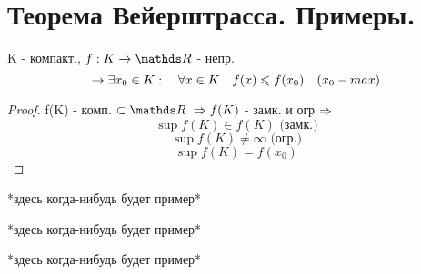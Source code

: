 \documentclass[geometry.tex]{subfiles}
\begin{document}
  \section{Теорема Вейерштрасса. Примеры.}

  \begin{theorem} [Вейерштрасса]
      K - компакт., $f: K \rightarrow \R $ - непр.
      \[\rightarrow \exists x_0 \in K: \quad \forall x \in K \quad f(x) \leqslant f(x_0) \quad (x_0 - max)\]
  \end{theorem}

  \begin{proof}
      f(K) - комп. $\subset \R \  \Ra f(K)$ - замк. и огр $\Rightarrow$
      \[\sup{f(K)} \in f(K)\text{ (замк.)}\]
      \[\sup{f(K)} \neq \infty\text{ (огр.)}\]
      \[\sup{f(K)} = f(x_0)\]
  \end{proof}

  \begin{example}
      *здесь когда-нибудь будет пример*
  \end{example}

  \begin{example}[искусственный]
      *здесь когда-нибудь будет пример*
  \end{example}

  \begin{example}
      *здесь когда-нибудь будет пример*
  \end{example}
\end{document}
